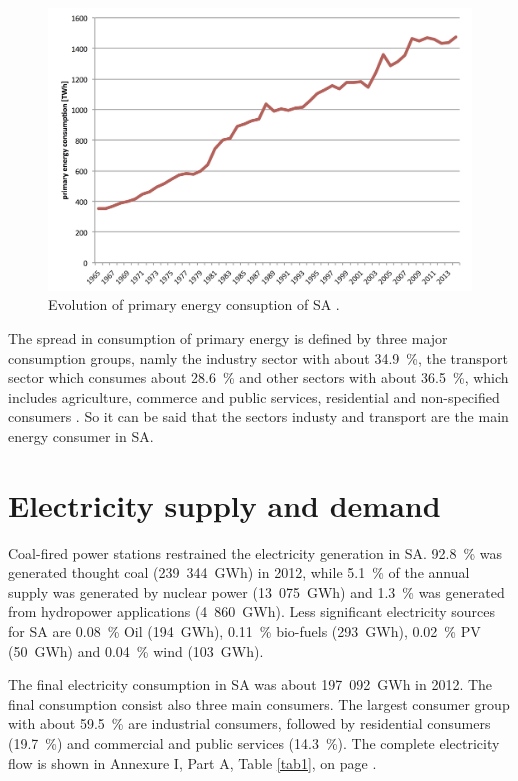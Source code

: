 \begin{figure}[htbp]  
\centering
\includegraphics[width=1\linewidth]{FIG/PrimEnergyDevelopment}
\caption[Evolution of primary energy consuption of SA.]{Evolution of primary energy consuption of SA \cite{BP2015c}.}\label{PrimEnergyDevelopment}
\end{figure}
The spread in consumption of primary energy is defined by three major consumption groups, namly the industry sector with about 34.9~\%, the transport sector which consumes about 28.6~\% and other sectors with about 36.5~\%, which includes agriculture, commerce and public services, residential and non-specified consumers \cite{DepartmentofEnergy2012}. So it can be said that the sectors industy and transport are the main energy consumer in SA. 
\pagebreak
\section{Electricity supply and demand}
Coal-fired power stations restrained the electricity generation in SA. 92.8~\% was generated thought coal (239~344~GWh) in 2012, while 5.1~\% of the annual supply was generated by nuclear power (13~075~GWh) and 1.3~\% was generated from hydropower applications (4~860~GWh). Less significant electricity sources for SA are 0.08~\% Oil (194~GWh), 0.11~\% bio-fuels (293~GWh), 0.02~\% PV (50~GWh) and 0.04~\% wind (103~GWh). \cite{Agency2015}



The final electricity consumption in SA was about 197~092~GWh in 2012. The final consumption consist also three main consumers. The largest consumer group with about 59.5~\% are industrial consumers, followed by residential consumers (19.7~\%) and commercial and public services (14.3~\%). The complete electricity flow is shown in Annexure I, Part A, Table \ref{tab1}, on page \pageref{tab1}. \cite{Agency2015}

